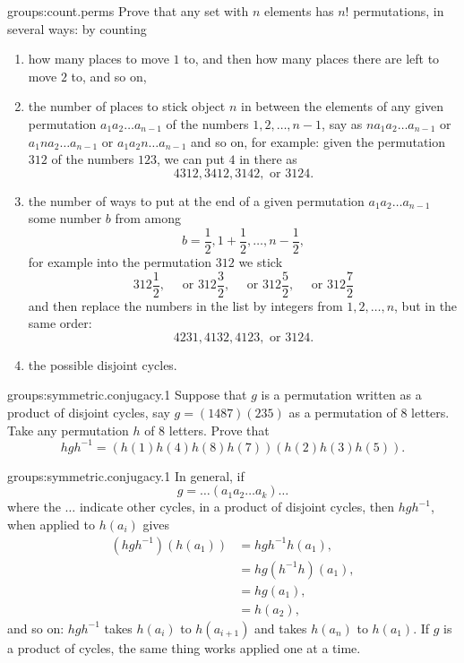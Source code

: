 \begin{problem}{groups:count.perms}
Prove that any set with \(n\) elements has \(n!\) permutations, in several ways: by counting 
\begin{enumerate}
\item how many places to move \(1\) to, and then how many places there are left to move \(2\) to, and so on,
\item the number of places to stick object \(n\) in between the elements of any given permutation \(a_1 a_2 \dots a_{n-1}\) of the numbers \(1,2,\dots,n-1\), say as \(n a_1 a_2 \dots a_{n-1}\) or \(a_1 n a_2 \dots a_{n-1}\) or \(a_1 a_2 n \dots a_{n-1}\) and so on, for example: given the permutation \(312\) of the numbers \(123\), we can put \(4\) in there as
\[
4312, 3412, 3142, \text{ or } 3124.
\]
\item the number of ways to put at the end of a given permutation \(a_1 a_2 \dots a_{n-1}\) some number \(b\) from among 
\[
b=\frac{1}{2}, 1+\frac{1}{2}, \dots, n-\frac{1}{2},
\]
for example into the permutation \(312\) we stick
\[
312\frac{1}{2}, \quad \text{ or }
312\frac{3}{2}, \quad \text{ or }
312\frac{5}{2}, \quad \text{ or }
312\frac{7}{2}
\]
and then replace the numbers in the list by integers from \(1,2,\dots,n\), but in the same order:
\[
4231, 4132, 4123, \text{ or } 3124.
\]
\item
the possible disjoint cycles.
\end{enumerate}
\end{problem}
\begin{problem}{groups:symmetric.conjugacy.1}
Suppose that \(g\) is a permutation written as a product of disjoint cycles, say \(g=(1487)(235)\) as a permutation of 8 letters.
Take any permutation \(h\) of 8 letters.
Prove that 
\[
hgh^{-1}=(h(1)h(4)h(8)h(7))(h(2)h(3)h(5)).
\]
\end{problem}
\begin{answer}{groups:symmetric.conjugacy.1}
In general, if 
\[
g=\dots (a_1 a_2 \dots a_k) \dots
\]
where the \(\dots\) indicate other cycles, in a product of disjoint cycles, then \(hgh^{-1}\), when applied to \(h(a_i)\) gives
\begin{align*}
(hgh^{-1})(h(a_1))
&=
hgh^{-1}h(a_1),
\\
&=
hg(h^{-1}h)(a_1),
\\
&=
hg(a_1),
\\
&=
h(a_{2}),
\end{align*}
and so on: \(hgh^{-1}\) takes \(h(a_i)\) to \(h(a_{i+1})\) and takes \(h(a_n)\) to \(h(a_1)\).
If \(g\) is a product of cycles, the same thing works applied one at a time.
\end{answer}

